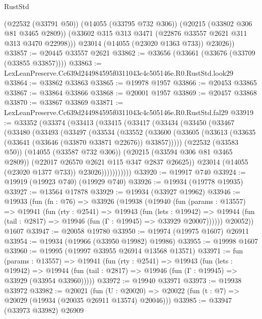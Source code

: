 \begin{lexlean}{RustStd}
\begin{coremodule}
          (@22532 (@33791 @50))
          (@14055 (@33795 @732 @306))
          (@20215 (@33802 @306 @81 @3465 @2809))
          (@33602 @315 @313 @3471 (@22876 @33557 @2621 @311 @313 @3470 @22998)))
        @23014
        (@14055 (@23020 @1363 @733))
        @23026))
@33857 := @20445 @33557 @2621
@33862 := @33656 (@33661 (@33676 (@33709 (@33855 @33857))))
@33863 := LexLeanPreserve.Cc639d244984595f0311043c4c505146e.R0.RustStd.look29
@33864 := @33862 @33863
@33865 := @19978 @1957
@33866 := @20453 @33865
@33867 := @33864 @33866
@33868 := @20001 @1957
@33869 := @20457 @33868
@33870 := @33867 @33869
@33871 := LexLeanPreserve.Cc639d244984595f0311043c4c505146e.R0.RustStd.fal29
@33919 := @33352
    (@33374
      (@33413
        (@33415
          (@33417
            (@33434
              (@33450
                (@33467
                  (@33480
                    (@33493
                      (@33497
                        (@33534
                          (@33552
                            (@33600
                              (@33605
                                (@33613 (@33635 (@33641 (@33646 (@33870 @33871 @22676)) @33857)))))
                            (@22532 (@33583 @50))
                            (@14055 (@33587 @732 @306))
                            (@20215 (@33594 @306 @81 @3465 @2809))
                            (@22017 @26570 @2621 @115 @347 @2837 @26625))
                          @23014
                          (@14055 (@23020 @1377 @733))
                          @23026)))))))))))
@33920 := @19917 @740
@33924 := @19919 (@19923 @740) (@19929 @740)
@33926 := @19934 (@19778 @19935)
@33927 := @13564 @17878
@33929 := @19934 (@33927 @19962)
@33946 := @19933
    (fun (fn : @76) =>
    @33926
      (@19938
        (@19940
          (fun (params : @13557) =>
          @19941
            (fun (rty : @2541) =>
            @19943
              (fun (lets : @19942) =>
              @19944 (fun (tail : @2817) => @19946 (fun (Γ : @19945) => @33929 @20007))))))
        @20052))
    @1607
@33947 := @20058 @19780
@33950 := @19974 (@19975 @1607) @26911
@33954 := @19934 (@19966 (@33950 @19982) @19986)
@33955 := @19998 @1607
@33960 := @19995 (@19997 @33955 @26914 @13568 @13571)
@33971 := fun (params : @13557) =>
  @19941
    (fun (rty : @2541) =>
    @19943
      (fun (lets : @19942) =>
      @19944 (fun (tail : @2817) => @19946 (fun (Γ : @19945) => @33929 (@33954 @33960)))))
@33972 := @19940 @33971
@33973 := @19938 @33972
@33982 := @20021
    (fun (U : @20020) => @20022 (fun (t : @7) => @20029 (@19934 (@20035 @26911 @13574) @20046)))
@33985 := @33947 (@33973 @33982) @26909

\end{coremodule}
\end{lexlean}
